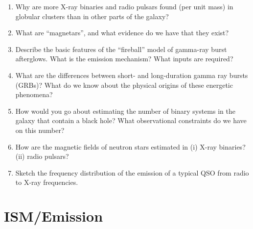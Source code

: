 \documentclass[10pt, oneside]{book}
\begin{document}
\begin{enumerate}[start=38]
    \item Why are more X-ray binaries and radio pulsars found (per unit mass) in globular clusters than in other parts of the galaxy?
    \item What are ``magnetars'', and what evidence do we have that they exist?
    \item Describe the basic features of the ``fireball'' model of gamma-ray burst afterglows. What is the emission mechanism? What inputs are required?
    \item What are the differences between short- and long-duration gamma ray bursts (GRBs)? What do we know about the physical origins of these energetic phenomena?
    \item How would you go about estimating the number of binary systems in the galaxy that contain a black hole? What observational constraints do we have on this number?
    \item How are the magnetic fields of neutron stars estimated in (i) X-ray binaries? (ii) radio pulsars?
    \item Sketch the frequency distribution of the emission of a typical QSO from radio to X-ray frequencies.
\end{enumerate}

\section{ISM/Emission}
\end{document}
